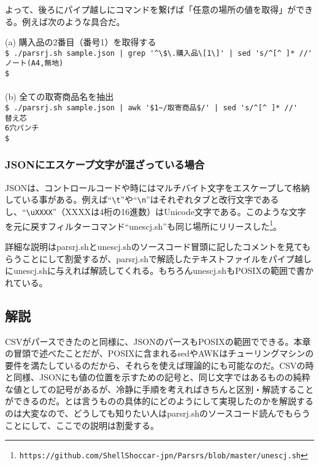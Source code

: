 よって、後ろにパイプ越しにコマンドを繋げば「任意の場所の値を取得」ができる。例えば次のような具合だ。
\begin{screen}
	(a) 購入品の2番目（番号1）を取得する \\
	\verb!$ ./parsrj.sh sample.json | grep '^\$\.購入品\[1\]' | sed 's/^[^ ]* //'! \return \\
	\verb|ノート(A4,無地)| \\
	\verb|$ | \\
	\\
	(b) 全ての取寄商品名を抽出 \\
	\verb!$ ./parsrj.sh sample.json | awk '$1~/取寄商品$/' | sed 's/^[^ ]* //'! \return \\
	\verb|替え芯| \\
	\verb|6穴パンチ| \\
	\verb|$ |
\end{screen}

\subsubsection*{JSONにエスケープ文字が混ざっている場合}

JSONは、コントロールコードや時にはマルチバイト文字をエスケープして格納している事がある。例えば``\verb|\t|''や``\verb|\n|''はそれぞれタブと改行文字であるし、``\verb|\uXXXX|''（XXXXは4桁の16進数）はUnicode文字である。このような文字を元に戻すフィルターコマンド``unescj.sh''も同じ場所にリリースした\footnote{\verb|https://github.com/ShellShoccar-jpn/Parsrs/blob/master/unescj.sh|}。

詳細な説明はparsrj.shとunescj.shのソースコード冒頭に記したコメントを見てもらうことにして割愛するが、parsrj.shで解読したテキストファイルをパイプ越しにunescj.shに与えれば解読してくれる。もちろんunescj.shもPOSIXの範囲で書かれている。

\subsection*{解説}

CSVがパースできたのと同様に、JSONのパースもPOSIXの範囲でできる。本章の冒頭で述べたことだが、POSIXに含まれるsedやAWKはチューリングマシンの要件を満たしているのだから、それらを使えば理論的にも可能なのだ。CSVの時と同様、JSONにも値の位置を示すための記号と、同じ文字ではあるものの純粋な値としての記号があるが、冷静に手順を考えればきちんと区別・解読することができるのだ。とは言うものの具体的にどのようにして実現したのかを解説するのは大変なので、どうしても知りたい人はparsrj.shのソースコード読んでもらうことにして、ここでの説明は割愛する。

